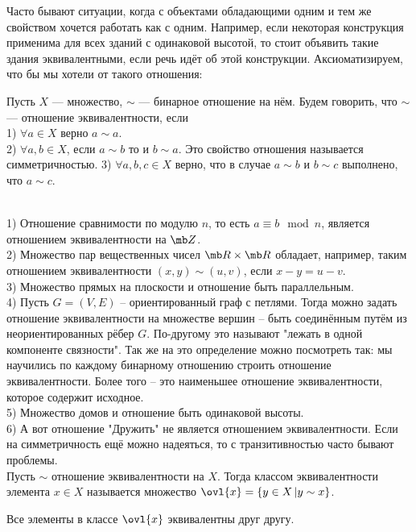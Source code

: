 Часто бывают ситуации, когда с объектами обладающими одним и тем же свойством хочется работать как с одним. Например, если некоторая конструкция применима для всех зданий с одинаковой высотой, то стоит объявить такие здания эквивалентными, если речь идёт об этой конструкции. Аксиоматизируем, что бы мы хотели от такого отношения:

\dfn Пусть $X$ --- множество, $\sim$ --- бинарное отношение на нём. Будем говорить, что $\sim$ --- отношение эквивалентности, если\\
1) $\forall a \in X$ верно $a \sim a$.\\
2) $\forall a,b \in X$, если $a\sim b$ то и $b \sim a$. Это свойство отношения называется симметричностью.
3)  $\forall a,b,c \in X$ верно, что в случае $a \sim b $ и $b \sim c$ выполнено, что $a \sim c$.
\edfn




\exm \\
1) Отношение сравнимости по модулю $n$, то есть $a\equiv b \mod n $, является отношением эквивалентности на $\mb Z$.\\
2) Множество пар вещественных чисел $\mb R \times \mb R$ обладает, например, таким отношением эквивалентности $(x,y)\sim (u,v)$, если $x-y=u-v$.\\
3) Множество прямых на плоскости и отношение быть параллельным.\\
4) Пусть $G=(V,E)$ -- ориентированный граф с петлями. Тогда можно задать отношение эквивалентности на множестве вершин -- быть соединённым путём из неориентированных рёбер $G$. По-другому это называют "лежать в одной компоненте связности". Так же на это определение можно посмотреть так: мы научились по каждому бинарному отношению строить отношение эквивалентности. Более того -- это наименьшее отношение эквивалентности, которое содержит исходное.\\
5) Множество домов и отношение быть одинаковой высоты.\\
6) А вот отношение "Дружить" не является отношением эквивалентности. Если на симметричность ещё можно надеяться, то с транзитивностью часто бывают проблемы. \\





\dfn Пусть $\sim $ отношение эквивалентности на $X$. Тогда классом эквивалентности элемента $x\in X$ называется множество $\ovl{x}=\{y \in X\,|y\sim x\}$. 
\edfn

\rm Все элементы в классе $\ovl{x}$ эквивалентны друг другу.
\erm 

